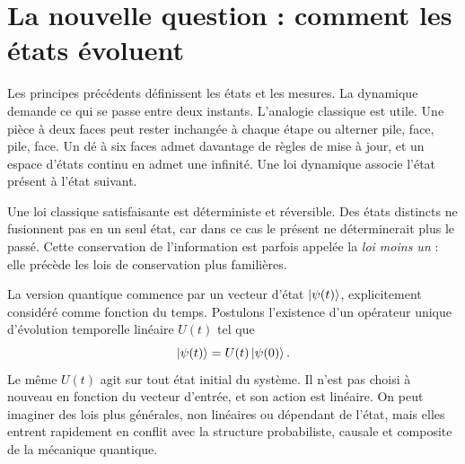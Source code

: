 \begin{classroomqa}
\end{classroomqa}

\begin{classroomqa}
\end{classroomqa}

\section{La nouvelle question : comment les états évoluent}

Les principes précédents définissent les états et les mesures. La dynamique demande ce qui se passe entre deux instants. L’analogie classique est utile. Une pièce à deux faces peut rester inchangée à chaque étape ou alterner pile, face, pile, face. Un dé à six faces admet davantage de règles de mise à jour, et un espace d’états continu en admet une infinité. Une loi dynamique associe l’état présent à l’état suivant.

Une loi classique satisfaisante est déterministe et réversible. Des états distincts ne fusionnent pas en un seul état, car dans ce cas le présent ne déterminerait plus le passé. Cette conservation de l’information est parfois appelée la \emph{loi moins un} : elle précède les lois de conservation plus familières.

La version quantique commence par un vecteur d’état \(\left\lvert\psi(t)\right\rangle\), explicitement considéré comme fonction du temps. Postulons l’existence d’un opérateur unique d’évolution temporelle linéaire \(U(t)\) tel que
\begin{equation}
\left\lvert\psi(t)\right\rangle=U(t)\left\lvert\psi(0)\right\rangle.
\label{eq:l4-time-development}
\end{equation}
Le même \(U(t)\) agit sur tout état initial du système. Il n’est pas choisi à nouveau en fonction du vecteur d’entrée, et son action est linéaire. On peut imaginer des lois plus générales, non linéaires ou dépendant de l’état, mais elles entrent rapidement en conflit avec la structure probabiliste, causale et composite de la mécanique quantique.

